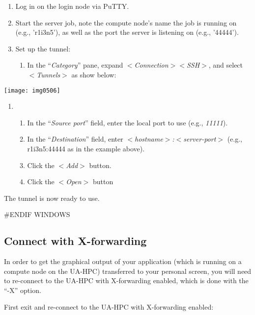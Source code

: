 \begin{enumerate}
\item  Log in on the login node via PuTTY.
\item  Start the server job, note the compute node's name the job is running on (e.g., 'r1i3n5'), as well as the port the server is listening on (e.g., '44444').
\item  Set up the tunnel:

\begin{enumerate}
\item  In the ``\textit{Category}'' pane, expand $<$\textit{Connection}$>$$<$\textit{SSH}$>$, and select $<$\textit{Tunnels}$>$ as show below:
\end{enumerate}
\end{enumerate}

\texttt{[image: img0506]}

\begin{enumerate}
\item \begin{enumerate}
\item  In the ``\textit{Source port}'' field, enter the local port to use (e.g., \textit{11111}).
\item  In the ``\textit{Destination}'' field, enter \textit{$<$hostname$>$:$<$server-port$>$} (e.g., r1i3n5:44444 as in the example above).
\item  Click the $<$\textit{Add}$>$ button.
\item  Click the $<$\textit{Open}$>$ button
\end{enumerate}
\end{enumerate}

The tunnel is now ready to use.

\#ENDIF WINDOWS

\subsection{Connect with X-forwarding }

In order to get the graphical output of your application (which is running on a compute node on the UA-HPC) transferred to your personal screen, you will need to re-connect to the UA-HPC with X-forwarding enabled, which is done with the ``-X'' option.

First exit and re-connect to the UA-HPC with X-forwarding enabled:


